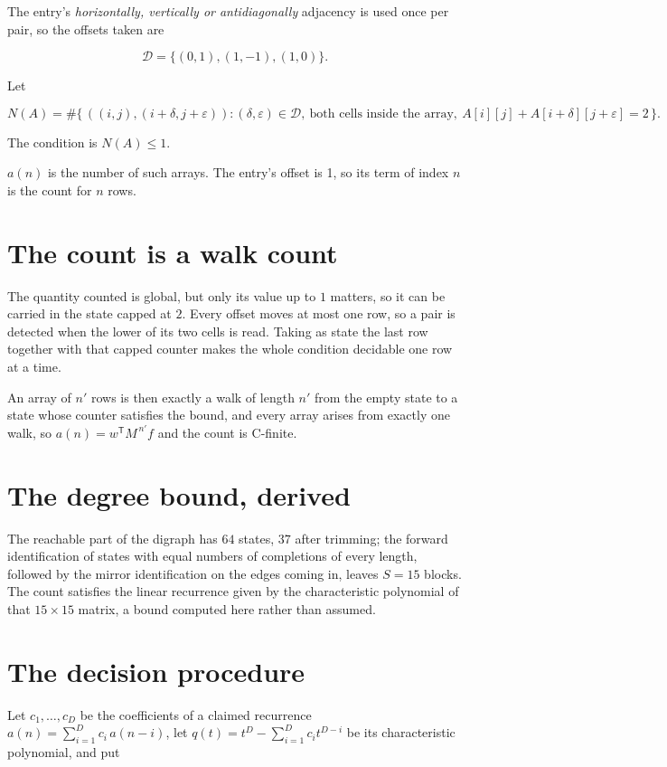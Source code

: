 \documentclass[11pt]{article}
\theoremstyle{definition}
\begin{document}
The entry's {\itshape horizontally, vertically or antidiagonally} adjacency is used once per pair, so the offsets taken are

\[\mathcal{D} = \{(0,1), (1,-1), (1,0)\}.\]

Let

\[N(A) = \#\bigl\{\,((i,j),(i{+}\delta,j{+}\varepsilon)) : (\delta,\varepsilon) \in \mathcal{D},\ \text{both cells inside the array},\ A[i][j] + A[i{+}\delta][j{+}\varepsilon] = 2\,\bigr\}.\]

The condition is $N(A) \le 1$.

$a(n)$ is the number of such arrays. The entry's offset is 1, so its term of index $n$ is the count for $n$ rows.

\section{The count is a walk count}

The quantity counted is global, but only its value up to $1$ matters, so it can be carried in the state capped at $2$. Every offset moves at most one row, so a pair is detected when the lower of its two cells is read. Taking as state the last row together with that capped counter makes the whole condition decidable one row at a time.

An array of $n'$ rows is then exactly a walk of length $n'$ from the empty state to a state whose counter satisfies the bound, and every array arises from exactly one walk, so $a(n) = w^{\mathsf T}M^{\,n'}f$ and the count is C-finite.

\section{The degree bound, derived}

The reachable part of the digraph has $64$ states, $37$ after trimming; the forward identification of states with equal numbers of completions of every length, followed by the mirror identification on the edges coming in, leaves $S = 15$ blocks. The count satisfies the linear recurrence given by the characteristic polynomial of that $15\times15$ matrix, a bound computed here rather than assumed.

\section{The decision procedure}

Let $c_1,\dots,c_D$ be the coefficients of a claimed recurrence $a(n) = \sum_{i=1}^{D} c_i\,a(n-i)$, let $q(t) = t^{D} - \sum_{i=1}^{D} c_i t^{D-i}$ be its characteristic polynomial, and put
\end{document}
